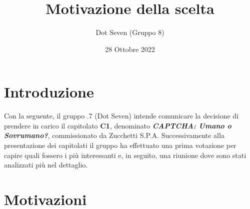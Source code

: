 \documentclass{article}
\title{Motivazione della scelta}
\author{Dot Seven (Gruppo 8)}
\date{28 Ottobre 2022}
\begin{document}
\maketitle
\begin{figure}[!h]
    \centering
\end{figure}
\tableofcontents

\newpage


\section{Introduzione}

Con la seguente, il gruppo .7 (Dot Seven) intende comunicare la decisione di prendere in carico il capitolato \textbf{C1}, denominato
\textit{\textbf{CAPTCHA: Umano o Sovrumano?}}, commissionato da Zucchetti S.P.A. Successivamente alla presentazione dei capitolati il gruppo ha effettuato una prima votazione per capire quali fossero i più interessanti e, in seguito, una riunione dove sono stati analizzati più nel dettaglio.

\section{Motivazioni}
\end{document}
